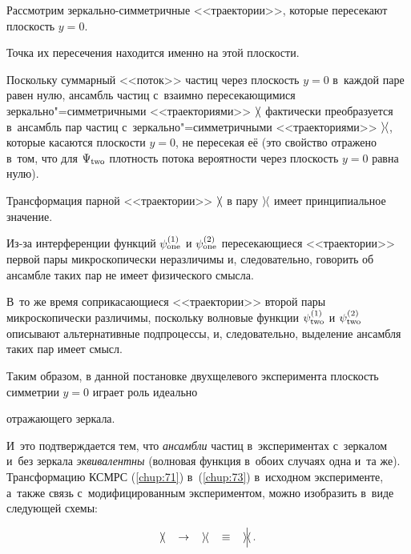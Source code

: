 Рассмотрим зеркально-симметричные <<траектории>>, которые пересекают плоскость $y=0$. 

Точка их пересечения находится именно на этой плоскости. 

Поскольку суммарный <<поток>> частиц через плоскость $y=0$ в~каждой паре равен нулю, ансамбль частиц с~взаимно пересекающимися зеркально"=симметричными <<траекториями>> $\rangle\hspace{-0.9mm}\langle$ фактически преобразуется в~ансамбль пар частиц с~зеркально"=симметричными <<траекториями>> $\rangle\hspace{-0.4mm}\langle$, которые касаются плоскости $y=0$, не пересекая её (это свойство отражено в~том, что для $\Psi_{\rm two}$ плотность потока вероятности через плоскость $y=0$ равна нулю).

Трансформация парной <<траектории>> $\rangle\hspace{-0.9mm}\langle$ в пару $\rangle\hspace{-0.4mm}\langle$ имеет принципиальное значение. 

Из-за интерференции функций $\psi_{\rm one}^{(1)}$ и $\psi_{\rm one}^{(2)}$ пересекающиеся <<траектории>> первой пары микроскопически неразличимы и, следовательно, говорить об ансамбле таких пар не имеет физического смысла. 

В~то же время соприкасающиеся <<траектории>> второй пары микроскопически различимы, поскольку волновые функции $\psi_{\rm two}^{(1)}$ и $\psi_{\rm two}^{(2)}$ описывают альтернативные подпроцессы, и, следовательно, выделение ансамбля таких пар имеет смысл.



Таким образом, в данной постановке двухщелевого эксперимента плоскость симметрии $y=0$ играет роль идеально

отражающего зеркала. 

И~это подтверждается тем, что {\it ансамбли} частиц в~экспериментах с~зеркалом и~без зеркала {\it эквивалентны} (волновая функция в~обоих случаях одна и~та же). Трансформацию КСМРС (\ref{chup:71}) в~(\ref{chup:73}) в~исходном эксперименте, а~также связь с~модифицированным экспериментом, можно изобразить в~виде следующей схемы:

\begin{equation*} %

\rangle\hspace{-0.9mm}\langle\mbox{\hspace{3mm}} \rightarrow \mbox{\hspace{3mm}} \rangle\hspace{-0.5mm}\langle \mbox{\hspace{3mm}} \equiv\mbox{\hspace{3mm}}

\rangle\hspace{-0.7mm}\Big |\hspace{-0.7mm} \langle \,.

\end{equation*}





